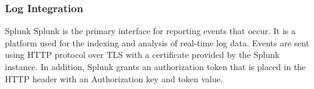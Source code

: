 \begin{frame}
\frametitle{Log Integration}
\begin{block}{Splunk}
Splunk is the primary interface for reporting events that occur. It is a platform used for the indexing and analysis of real-time log data.
Events are sent using HTTP protocol over TLS with a certificate provided by the Splunk instance. In addition, Splunk grants an authorization token that is placed in the HTTP header with an Authorization key and token value.
 \end{block}
\end{frame}

